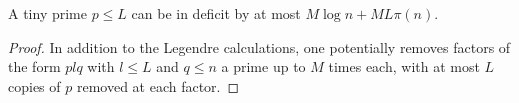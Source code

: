\begin{sublemma}
\label{initial-factorization-tiny-prime-ge}
\leanok
A tiny prime $p \leq L$ can be in deficit by at most $M\log n + ML\pi(n)$.
\end{sublemma}
\begin{proof}
\leanok
In addition to the Legendre calculations, one potentially removes factors of the
  form $plq$ with $l \leq L$ and $q \leq n$ a prime up to $M$ times each, with at most $L$ copies
  of $p$ removed at each factor.
\end{proof}
